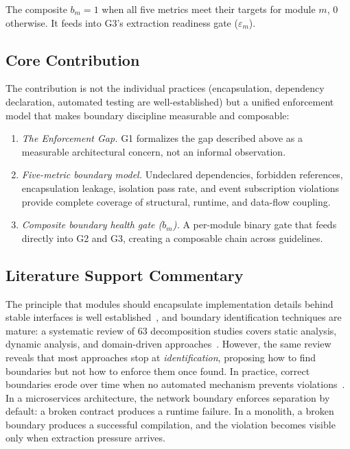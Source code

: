 \medskip
\noindent
The composite $b_m = 1$ when all five metrics meet their targets for module $m$, 0 otherwise. It feeds into G3's extraction readiness gate ($\varepsilon_m$).

\subsection*{Core Contribution}

The contribution is not the individual practices (encapsulation, dependency declaration, automated testing are well-established) but a unified enforcement model that makes boundary discipline measurable and composable:

\begin{enumerate}[itemsep=8pt,topsep=2pt]
  \item \emph{The Enforcement Gap.} G1 formalizes the gap described above as a measurable architectural concern, not an informal observation.

  \item \emph{Five-metric boundary model.} Undeclared dependencies, forbidden references, encapsulation leakage, isolation pass rate, and event subscription violations provide complete coverage of structural, runtime, and data-flow coupling.

  \item \emph{Composite boundary health gate ($b_m$).} A per-module binary gate that feeds directly into G2 and G3, creating a composable chain across guidelines.
\end{enumerate}

\subsection*{Literature Support Commentary}

The principle that modules should encapsulate implementation details behind stable interfaces is well established~\cite{parnas1972informationhiding}, and boundary identification techniques are mature: a systematic review of 63 decomposition studies covers static analysis, dynamic analysis, and domain-driven approaches~\cite{abgaz2023decomposition}. However, the same review reveals that most approaches stop at \emph{identification}, proposing how to find boundaries but not how to enforce them once found. In practice, correct boundaries erode over time when no automated mechanism prevents violations~\cite{wolfart2021modernizing, deLauretis2019from}. In a microservices architecture, the network boundary enforces separation by default: a broken contract produces a runtime failure. In a monolith, a broken boundary produces a successful compilation, and the violation becomes visible only when extraction pressure arrives.

